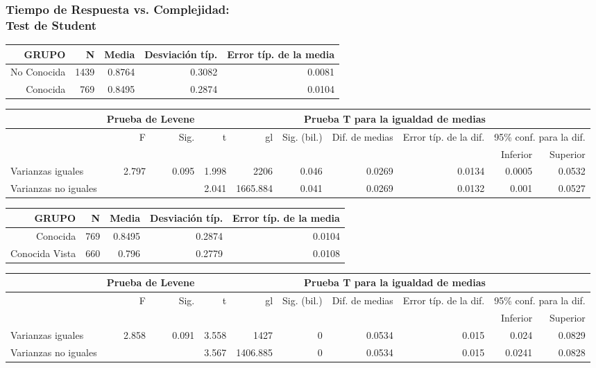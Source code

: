 \documentclass[10pt]{beamer}
\begin{document}
      \begin{frame}
      \tiny
	  \frametitle{Tiempo de Respuesta vs. Complejidad:\\Test de Student}
	\begin{table}
	  \begin{tabular}[t]{|r|r|r|r|r|}
	    \hline
		GRUPO & N & Media & Desviación típ. & Error típ. de la media \\ \hline
		No Conocida & 1439 & 0.8764 & 0.3082 & 0.0081 \\ \hline
		Conocida & 769 & 0.8495 & 0.2874 & 0.0104 \\ \hline
	  \end{tabular}
	  \begin{tabular}[t]{|l|r|r|r|r|r|r|r|r|r|}
	    \hline
		  & \multicolumn{2}{|c|}{Prueba de Levene} &  \multicolumn{7}{|c|}{Prueba T para la igualdad de medias} \\ \hline
		  & F & Sig. & t & gl & Sig. (bil.) & Dif. de medias & Error típ. de la dif. & \multicolumn{2}{|c|}{95\% conf. para la dif.} \\ \hline
		  &   &   &   &   &   &   &   & Inferior & Superior \\ \hline
		Varianzas iguales & 2.797 & 0.095 & 1.998 & 2206 & 0.046 & 0.0269 & 0.0134 & 0.0005 & 0.0532 \\ \hline
		Varianzas no iguales &   &   & 2.041 & 1665.884 & 0.041 & 0.0269 & 0.0132 & 0.001 & 0.0527 \\ \hline
	  \end{tabular}
	\end{table}

	\begin{table}
	  \begin{tabular}[t]{|r|r|r|r|r|}
	    \hline
		GRUPO & N & Media & Desviación típ. & Error típ. de la media \\ \hline
		Conocida  & 769 & 0.8495 & 0.2874 & 0.0104 \\ \hline
		Conocida Vista & 660 & 0.796 & 0.2779 & 0.0108 \\ \hline
	  \end{tabular}
	  \begin{tabular}[t]{|l|r|r|r|r|r|r|r|r|r|}
	    \hline
		  & \multicolumn{2}{|c|}{Prueba de Levene} &  \multicolumn{7}{|c|}{Prueba T para la igualdad de medias} \\ \hline
		  & F & Sig. & t & gl & Sig. (bil.) & Dif. de medias & Error típ. de la dif. & \multicolumn{2}{|c|}{95\% conf. para la dif.} \\ \hline
		  &   &   &   &   &   &   &   & Inferior & Superior \\ \hline
	    Varianzas iguales & 2.858 & 0.091 & 3.558 & 1427 & 0 & 0.0534 & 0.015 & 0.024 & 0.0829 \\ \hline
	    Varianzas no iguales &   &   & 3.567 & 1406.885 & 0 & 0.0534 & 0.015 & 0.0241 & 0.0828 \\ \hline
	  \end{tabular}
	\end{table}


\end{frame}
\end{document}
